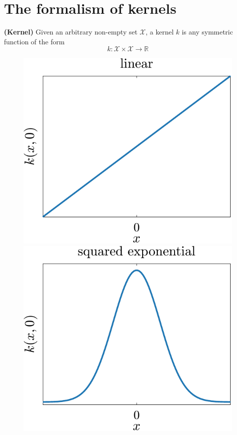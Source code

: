 \section{The formalism of kernels}
\label{sec.formalism_of_kernels}

\begin{definition}
	\textbf{(Kernel)} Given an arbitrary non-empty set $\mathcal{X}$, a kernel $k$ is any symmetric function of the form
	\begin{equation}
		k: \mathcal{X} \times \mathcal{X} \rightarrow \mathbb{R}
	\end{equation}
\end{definition}

\begin{figure}[t]
	\centering
	\includegraphics[scale=0.4]{../images/chap2_kernel_li.pdf} \hspace{3pt}
	\includegraphics[scale=0.4]{../images/chap2_kernel_se.pdf} \hspace{3pt}

\end{figure}
